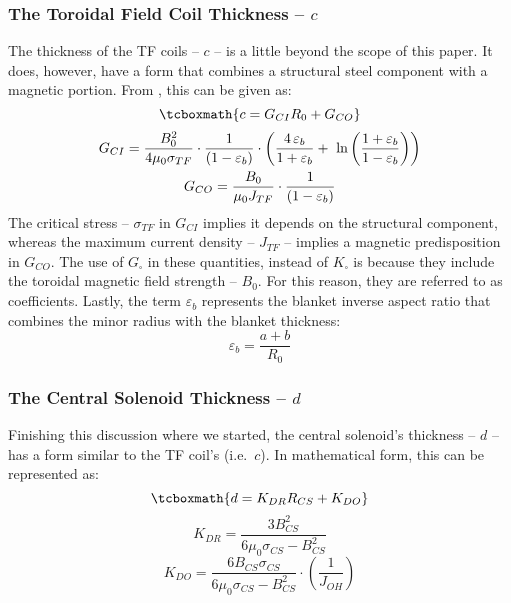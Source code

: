 \subsubsection{The Toroidal Field Coil Thickness -- $c$}

The thickness of the TF coils -- $c$ -- is a little beyond the scope of this paper. It does, however, have a form that combines a structural steel component with a magnetic portion. From , this can be given as: \cite{minervini}
\begin{equation}
	\label{eq:cc}
	\tcboxmath{
	c = G_{CI} R_0 + G_{CO}
	}
\end{equation}
\begin{gather}
	G_{CI} = \frac{B_{0}^2}{ 4 \mu_0 \sigma_{TF} } \cdot \frac{1}{ ( 1 - \varepsilon_b )}  \cdot \left( \frac{ 4 \, \varepsilon_b}{1+\varepsilon_b} + \ \textnormal{ln} \left( \frac{1+\varepsilon_b}{1-\varepsilon_b} \right) \right) \\
	G_{CO} = \frac{B_{0}}{ \mu_0 J_{TF} } \cdot \frac{1}{ ( 1 - \varepsilon_b )}
\end{gather}
The critical stress -- $\sigma_{TF}$ in $G_{CI}$ implies it depends on the structural component, whereas the maximum current density -- $J_{TF}$ -- implies a magnetic predisposition in $G_{CO}$. The use of $G_\square$ in these quantities, instead of $K_\square$ is because they include the toroidal magnetic field strength -- $B_0$. For this reason, they are referred to as  coefficients. Lastly, the term $\varepsilon_b$ represents the blanket inverse aspect ratio that combines the minor radius with the blanket thickness:
\begin{equation}
	\varepsilon_b = \frac{ a + b }{R_0}
\end{equation}

\subsubsection{The Central Solenoid Thickness -- $d$}

Finishing this discussion where we started, the central solenoid's thickness -- $d$ -- has a form similar to the TF coil's (i.e.\ $c$). In mathematical form, this can be represented as: \cite{minervini}
 \begin{equation}
 	\label{eq:dd}
 	\tcboxmath{
	d = K_{DR} R_{CS} + K_{DO}
	}
\end{equation}
\begin{equation}
	K_{DR} = \frac{3 B_{CS}^2}{ 6 \mu_0 \sigma_{CS}  - B_{CS}^2 }
\end{equation}
\begin{equation}
	K_{DO} = \frac{6 B_{CS} \sigma_{CS}}{ 6 \mu_0 \sigma_{CS}  - B_{CS}^2 } \cdot \left( \frac{1}{J_{OH}} \right)
\end{equation}

